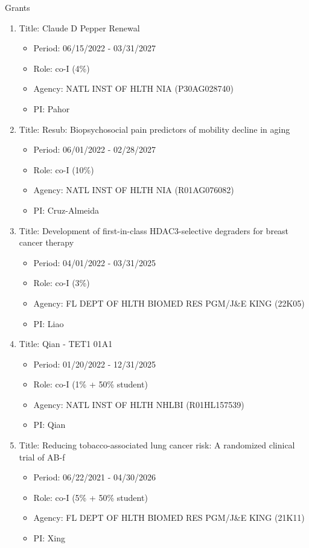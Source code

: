 \documentclass{resume} %
\begin{document}
\begin{rSection}{Grants}
\begin{enumerate}[noitemsep,topsep=0pt]
\item Title: Claude D Pepper Renewal
\begin{itemize}[noitemsep,topsep=0pt,leftmargin=*]
\item[] Period: 06/15/2022 - 03/31/2027
\item[] Role: co-I (4\%)
\item[] Agency: NATL INST OF HLTH NIA (P30AG028740)
\item[] PI: Pahor
\end{itemize}

\item Title: Resub: Biopsychosocial pain predictors of mobility decline in aging
\begin{itemize}[noitemsep,topsep=0pt,leftmargin=*]
\item[] Period: 06/01/2022 - 02/28/2027
\item[] Role: co-I (10\%)
\item[] Agency: NATL INST OF HLTH NIA (R01AG076082)
\item[] PI: Cruz-Almeida
\end{itemize}

\item Title: Development of first-in-class HDAC3-selective degraders for breast cancer therapy
\begin{itemize}[noitemsep,topsep=0pt,leftmargin=*]
\item[] Period: 04/01/2022 - 03/31/2025
\item[] Role: co-I (3\%)
\item[] Agency: FL DEPT OF HLTH BIOMED RES PGM/J\&E KING (22K05)
\item[] PI: Liao
\end{itemize}

\item Title: Qian - TET1 01A1
\begin{itemize}[noitemsep,topsep=0pt,leftmargin=*]
\item[] Period: 01/20/2022 - 12/31/2025
\item[] Role: co-I (1\% + 50\% student)
\item[] Agency: NATL INST OF HLTH NHLBI (R01HL157539)
\item[] PI: Qian
\end{itemize}

\item Title: Reducing tobacco-associated lung cancer risk: A randomized clinical trial of AB-f
\begin{itemize}[noitemsep,topsep=0pt,leftmargin=*]
\item[] Period: 06/22/2021 - 04/30/2026
\item[] Role: co-I (5\% + 50\% student)
\item[] Agency: FL DEPT OF HLTH BIOMED RES PGM/J\&E KING (21K11)
\item[] PI: Xing
\end{itemize}


\end{enumerate}
\end{rSection}
\end{document}
